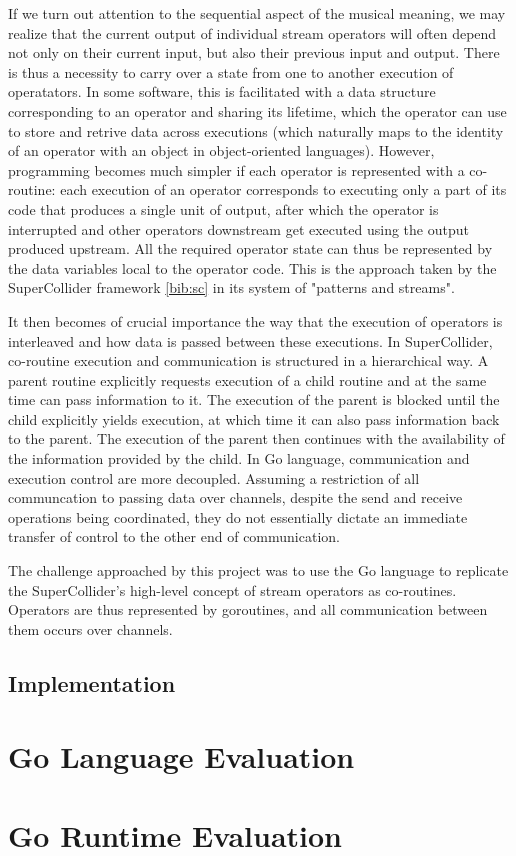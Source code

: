 \documentclass {article}
\begin{document}
If we turn out attention to the sequential aspect of the musical meaning, we may realize that the current output of individual stream operators will often depend not only on their current input, but also their previous input and output. There is thus a necessity to carry over a state from one to another execution of operatators. In some software, this is facilitated with a data structure corresponding to an operator and sharing its lifetime, which the operator can use to store and retrive data across executions (which naturally maps to the identity of an operator with an object in object-oriented languages). However, programming becomes much simpler if each operator is represented with a co-routine: each execution of an operator corresponds to executing only a part of its code that produces a single unit of output, after which the operator is interrupted and other operators downstream get executed using the output produced upstream. All the required operator state can thus be represented by the data variables local to the operator code. This is the approach taken by the SuperCollider framework \ref{bib:sc} in its system of "patterns and streams".

It then becomes of crucial importance the way that the execution of operators is interleaved and how data is passed between these executions. In SuperCollider, co-routine execution and communication is structured in a hierarchical way. A parent routine explicitly requests execution of a child routine and at the same time can pass information to it. The execution of the parent is blocked until the child explicitly yields execution, at which time it can also pass information back to the parent. The execution of the parent then continues with the availability of the information provided by the child. In Go language, communication and execution control are more decoupled. Assuming a restriction of all communcation to passing data over channels, despite the send and receive operations being coordinated, they do not essentially dictate an immediate transfer of control to the other end of communication.

The challenge approached by this project was to use the Go language to replicate the SuperCollider's high-level concept of stream operators as co-routines. Operators are thus represented by goroutines, and all communication between them occurs over channels.

\subsection{Implementation}



\section{Go Language Evaluation}
\label{sec:language}

\section{Go Runtime Evaluation}
\label{sec:runtime}
\end{document}
